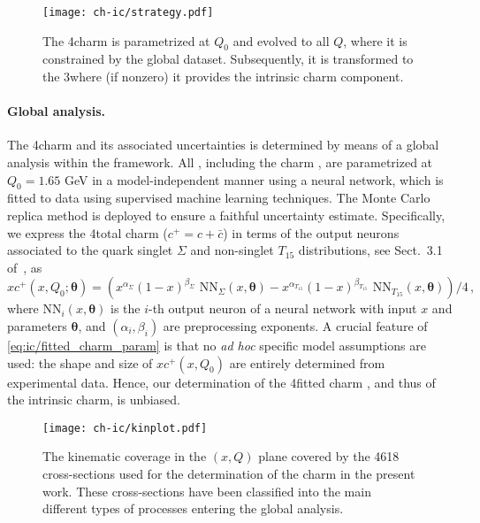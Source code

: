 \begin{figure}[h]
\begin{center}
  \texttt{[image: ch-ic/strategy.pdf]}
 \end{center}
\vspace{-0.2cm}
\caption{The 4\fns charm \pdf is parametrized  at $Q_0$
  and evolved to all  $Q$, where it is  constrained by the 
  global dataset. 
 Subsequently, it is transformed to the 3\fns where (if nonzero) it
 provides the intrinsic charm component.
  \label{fig:ic/strategy}
}
\end{figure}

\paragraph{Global \qcd analysis.}
%
The 4\fns charm \pdf and its associated
uncertainties is determined by means of a global \qcd analysis
within the  framework.
%
All \pdfs, including the charm \pdf, are  parametrized at $Q_0=1.65$ GeV in 
a model-independent manner using a neural network, which is fitted to data using 
supervised machine learning techniques.
The Monte Carlo replica method
is deployed to ensure a faithful uncertainty estimate.
%
Specifically, we express the 4\fns total charm \pdf ($c^+=c+\bar{c}$)  in terms of the output neurons associated to the quark singlet $\Sigma$ and non-singlet $T_{15}$
distributions, see Sect.~3.1 of~\cite{Ball:2021leu}, as
\begin{equation}
\label{eq:ic/fitted_charm_param}
xc^+(x,Q_0;{\boldsymbol \theta}) =
\left( x^{\alpha_{\Sigma}}(1-x)^{\beta_{\Sigma}} \textrm{ NN}_{\Sigma}(x,{\boldsymbol \theta})-
x^{\alpha_{T_{15}}}(1-x)^{\beta_{T_{15}}} \textrm{ NN}_{T_{15}}(x,{\boldsymbol \theta})
\right)/4 \, ,
\end{equation}
where $\textrm{NN}_{i}(x,{\boldsymbol \theta})$ is the $i$-th output neuron of
a neural network with input $x$ and  parameters ${\boldsymbol \theta}$, and 
$\left(\alpha_i,\beta_i\right)$ are preprocessing exponents.
%
A crucial feature of \cref{eq:ic/fitted_charm_param} is that no \textit{
ad hoc} specific model assumptions are used: the shape and size of
$xc^+(x,Q_0)$ are entirely determined from experimental data.
%
Hence, our determination of the 4\fns fitted charm \pdf, and thus of the intrinsic charm, is unbiased.
%

\begin{figure}[t]
\begin{center}
  \texttt{[image: ch-ic/kinplot.pdf]}
 \end{center}
\vspace{-0.8cm}
\caption{The kinematic coverage in the $(x,Q)$ plane
  covered by the 4618 cross-sections used for the
  determination of the charm \pdf in the present work.
  These cross-sections have been classified into the main different
  types of processes entering the global analysis.
  \label{fig:ic/kinplot}
}
\end{figure}


